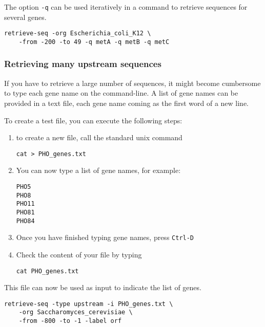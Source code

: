 The option \texttt{-q} can be used iteratively in a command to
retrieve sequences for several genes.

\begin{verbatim}
retrieve-seq -org Escherichia_coli_K12 \
    -from -200 -to 49 -q metA -q metB -q metC
\end{verbatim}



\subsubsection{Retrieving many upstream sequences}

If you have to retrieve a large number of sequences, it might become
cumbersome to type each gene name on the command-line. A list of gene
names can be provided in a text file, each gene name coming as the
first word of a new line.

To create a test file, you can execute the following steps:
\begin{enumerate}
\item to create a new file, call the standard unix command 

\begin{verbatim}
cat > PHO_genes.txt
\end{verbatim} 

\item You can now type a list of gene names, for example:

\begin{verbatim}
PHO5
PHO8
PHO11
PHO81
PHO84
\end{verbatim} 

\item Once you have finished typing gene names, press \texttt{Ctrl-D}

\item Check the content of your file by typing 

\begin{verbatim}
cat PHO_genes.txt
\end{verbatim} 

\end{enumerate}


This file can now be used as input to indicate the list of genes.

\begin{verbatim}
retrieve-seq -type upstream -i PHO_genes.txt \
    -org Saccharomyces_cerevisiae \
    -from -800 -to -1 -label orf
\end{verbatim} 

